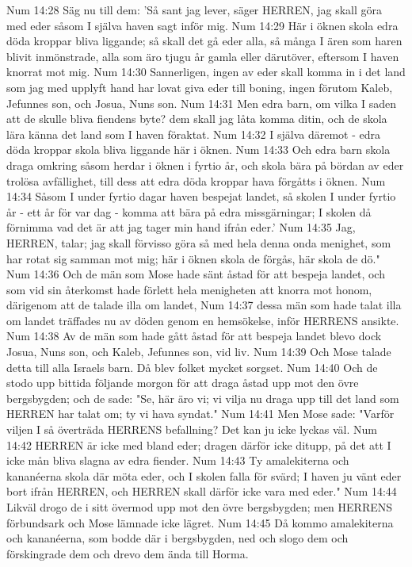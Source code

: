 Num 14:28  Säg nu till dem: 'Så sant jag lever, säger HERREN, jag skall göra med eder såsom I själva haven sagt inför mig.
Num 14:29  Här i öknen skola edra döda kroppar bliva liggande; så skall det gå eder alla, så många I ären som haren blivit inmönstrade, alla som äro tjugu år gamla eller därutöver, eftersom I haven knorrat mot mig.
Num 14:30  Sannerligen, ingen av eder skall komma in i det land som jag med upplyft hand har lovat giva eder till boning, ingen förutom Kaleb, Jefunnes son, och Josua, Nuns son.
Num 14:31  Men edra barn, om vilka I saden att de skulle bliva fiendens byte? dem skall jag låta komma ditin, och de skola lära känna det land som I haven föraktat.
Num 14:32  I själva däremot - edra döda kroppar skola bliva liggande här i öknen.
Num 14:33  Och edra barn skola draga omkring såsom herdar i öknen i fyrtio år, och skola bära på bördan av eder trolösa avfällighet, till dess att edra döda kroppar hava förgåtts i öknen.
Num 14:34  Såsom I under fyrtio dagar haven bespejat landet, så skolen I under fyrtio år - ett år för var dag - komma att bära på edra missgärningar; I skolen då förnimma vad det är att jag tager min hand ifrån eder.'
Num 14:35  Jag, HERREN, talar; jag skall förvisso göra så med hela denna onda menighet, som har rotat sig samman mot mig; här i öknen skola de förgås, här skola de dö."
Num 14:36  Och de män som Mose hade sänt åstad för att bespeja landet, och som vid sin återkomst hade förlett hela menigheten att knorra mot honom, därigenom att de talade illa om landet,
Num 14:37  dessa män som hade talat illa om landet träffades nu av döden genom en hemsökelse, inför HERRENS ansikte.
Num 14:38  Av de män som hade gått åstad för att bespeja landet blevo dock Josua, Nuns son, och Kaleb, Jefunnes son, vid liv.
Num 14:39  Och Mose talade detta till alla Israels barn. Då blev folket mycket sorgset.
Num 14:40  Och de stodo upp bittida följande morgon för att draga åstad upp mot den övre bergsbygden; och de sade: "Se, här äro vi; vi vilja nu draga upp till det land som HERREN har talat om; ty vi hava syndat."
Num 14:41  Men Mose sade: "Varför viljen I så överträda HERRENS befallning? Det kan ju icke lyckas väl.
Num 14:42  HERREN är icke med bland eder; dragen därför icke ditupp, på det att I icke mån bliva slagna av edra fiender.
Num 14:43  Ty amalekiterna och kananéerna skola där möta eder, och I skolen falla för svärd; I haven ju vänt eder bort ifrån HERREN, och HERREN skall därför icke vara med eder."
Num 14:44  Likväl drogo de i sitt övermod upp mot den övre bergsbygden; men HERRENS förbundsark och Mose lämnade icke lägret.
Num 14:45  Då kommo amalekiterna och kananéerna, som bodde där i bergsbygden, ned och slogo dem och förskingrade dem och drevo dem ända till Horma.

